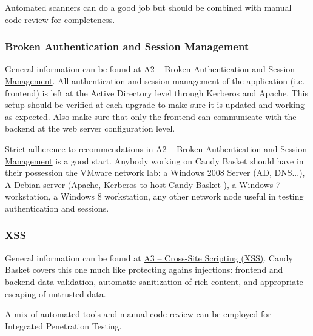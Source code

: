 \documentclass[letterpaper,10pt,english]{sphinxmanual}
\begin{document}
Automated scanners can do a good job but should be combined with
manual code review for completeness.


\subsubsection{Broken Authentication and Session Management}
\label{developer-guide:broken-authentication-and-session-management}
General information can be found at \href{https://owasp.org/index.php/Top\_10\_2013-A2-Broken\_Authentication\_and\_Session\_Management}{A2 -- Broken Authentication and
Session Management}. All
authentication and session management of the application
(i.e. frontend) is left at the Active Directory level through Kerberos
and Apache. This setup should be verified at each upgrade to make sure
it is updated and working as expected. Also make sure that only the
frontend can communicate with the backend at the web server
configuration level.

Strict adherence to recommendations in \href{https://owasp.org/index.php/Top\_10\_2013-A2-Broken\_Authentication\_and\_Session\_Management}{A2 -- Broken Authentication
and Session Management}
is a good start. Anybody working on Candy Basket should have in their
possession the VMware network lab: a Windows 2008 Server (AD, DNS...),
A Debian server (Apache, Kerberos to host Candy Basket ), a Windows 7
workstation, a Windows 8 workstation, any other network node useful in
testing authentication and sessions.


\subsubsection{XSS}
\label{developer-guide:xss}
General information can be found at \href{https://owasp.org/index.php/Top\_10\_2013-A3-Cross-Site\_Scripting\_(XSS)}{A3 -- Cross-Site Scripting (XSS)}. Candy
Basket covers this one much like protecting agains injections:
frontend and backend data validation, automatic sanitization of rich
content, and appropriate escaping of untrusted data.

A mix of automated tools and manual code review can be employed for
Integrated Penetration Testing.
\end{document}
